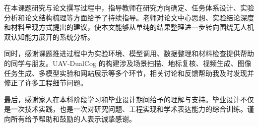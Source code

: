 
\begin{acknowledgements}
在本课题研究与论文撰写过程中，指导教师在研究方向确定、任务体系设计、实验分析和论文结构梳理等方面给予了持续指导。老师对论文中心思想、实验结论深度和材料呈现方式提出的建议，使本文能够从单纯的结果整理进一步转向围绕无人机双认知能力展开的系统分析。

同时，感谢课题推进过程中为实验环境、模型调用、数据整理和材料检查提供帮助的同学与朋友。UAV-DualCog 的构建涉及场景扫描、地标复核、视频生成、图像任务生成、多模型实验和网站展示等多个环节，相关讨论和反馈帮助我及时发现并修正了许多工程细节问题。

最后，感谢家人在本科阶段学习和毕业设计期间给予的理解与支持。毕业设计不仅是一次技术实践，也是一次对研究问题、工程实现和学术表达能力的综合训练。谨向所有给予帮助和鼓励的人表示诚挚感谢。
\end{acknowledgements}
